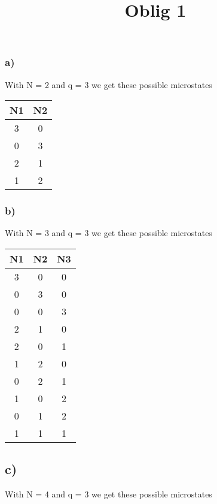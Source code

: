 \documentclass[12pt]{article}
\begin{document}
\title{Oblig 1}

\subsubsection*{a)}
With N = 2 and q = 3 we get these possible microstates

\begin{table}[hb!]
\begin{tabular}{c|c}

N1 & N2 \\
\hline

3 & 0 \\
0 & 3 \\
2 & 1 \\
1 & 2 \\

\end{tabular}
\end{table}


\subsubsection*{b)}
With N = 3 and q = 3 we get these possible microstates

\begin{table}[hb!]
\begin{tabular}{c|c|c}
N1 & N2 & N3\\
\hline
3 & 0 & 0 \\
0 & 3 & 0 \\
0 & 0 & 3 \\
2 & 1 & 0 \\
2 & 0 & 1 \\
1 & 2 & 0 \\
0 & 2 & 1 \\
1 & 0 & 2 \\
0 & 1 & 2 \\
1 & 1 & 1 \\
\end{tabular}
\end{table}

\newpage

\subsection*{c)}
With N = 4 and q = 3 we get these possible microstates
\end{document}
